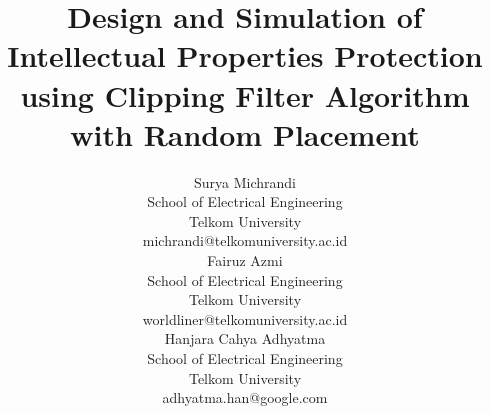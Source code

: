 \documentclass[10pt,journal,compsoc]{IEEEtran}
\begin{document}
\title{Design and Simulation of Intellectual Properties Protection using Clipping Filter Algorithm\\with Random Placement}


\author{
	\begin{multicols}{3}
	Surya Michrandi\\
	School of Electrical Engineering\\
	Telkom University\\
	michrandi@telkomuniversity.ac.id\\

	Fairuz Azmi\\
	School of Electrical Engineering\\
	Telkom University\\
	worldliner@telkomuniversity.ac.id\\

	Hanjara Cahya Adhyatma\\
	School of Electrical Engineering\\
	Telkom University\\
	adhyatma.han@google.com\\
	\end{multicols}
}


\end{document}
